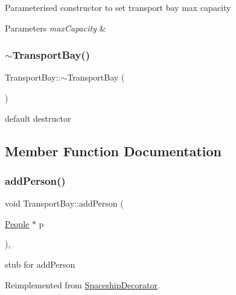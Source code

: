 Parameterised constructor to set transport bay max capacity 
\begin{DoxyParams}{Parameters}
{\em max\+Capacity} & \\
\hline
\end{DoxyParams}
\mbox{\label{classTransportBay_a14dad2eb1e9cb83bb85de4574c2bcbb2}} 
\subsubsection{\texorpdfstring{$\sim$\+Transport\+Bay()}{~TransportBay()}}
{\footnotesize\ttfamily Transport\+Bay\+::$\sim$\+Transport\+Bay (\begin{DoxyParamCaption}{ }\end{DoxyParamCaption})}

default destructor 

\subsection{Member Function Documentation}
\mbox{\label{classTransportBay_a2be08f6085583ec9f839ff8939c6a6b7}} 
\subsubsection{\texorpdfstring{add\+Person()}{addPerson()}}
{\footnotesize\ttfamily void Transport\+Bay\+::add\+Person (\begin{DoxyParamCaption}\item[{\hyperlink{classPeople}{People} $\ast$}]{p }\end{DoxyParamCaption})\hspace{0.3cm}{\ttfamily [inline]}, {\ttfamily [virtual]}}

stub for add\+Person 

Reimplemented from \hyperlink{classSpaceshipDecorator_a6e289d8a65f35b9f223255ae0eaa3b00}{Spaceship\+Decorator}.

\mbox{\label{classTransportBay_acd6b5b09e81bd28c6dcbe23d561fd99c}} 
